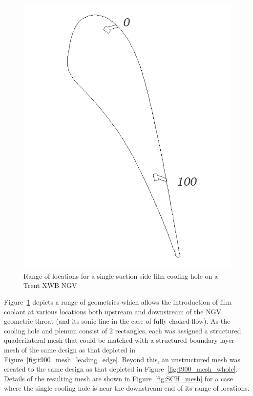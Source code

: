 \documentclass[a4paper, 11pt, oneside]{report}
\begin{document}
\begin{figure}[H]
	\centering
	\includegraphics[width=.45\textwidth]{figs/SCH_hole_range.png}
	\caption{Range of locations for a single suction-side film cooling hole on a Trent XWB NGV}
    \label{fig:SCH_hole_range}
\end{figure}

Figure~\ref{fig:SCH_hole_range} depicts a range of geometries which allows the introduction of film coolant at various locations both upstream and downstream of the NGV geometric throat (and its sonic line in the case of fully choked flow). As the cooling hole and plenum consist of 2 rectangles, each was assigned a structured quaderilateral mesh that could be matched with a structured boundary layer mesh of the same design as that depicted in Figure~\ref{fig:t900_mesh_leading_edge}. Beyond this, an unstructured mesh was created to the same design as that depicted in Figure~\ref{fig:t900_mesh_whole}. Details of the resulting mesh are shown in Figure~\ref{fig:SCH_mesh} for a case where the single cooling hole is near the downstream end of its range of locations.
\end{document}
